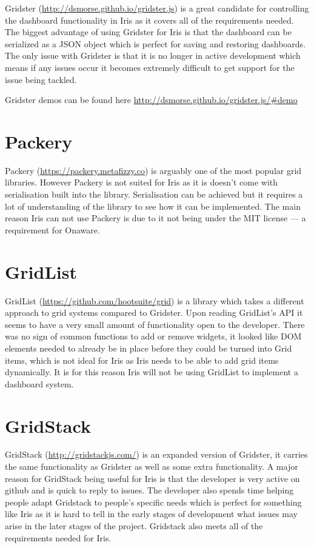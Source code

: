 \documentclass[12pt,a4paper,titlepage]{report}
\begin{document}
\begin{appendices}
Gridster (\url{http://dsmorse.github.io/gridster.js}) is a great candidate for controlling the dashboard functionality in Iris as it covers all of the requirements needed. The biggest advantage of using Gridster for Iris is that the dashboard can be serialized as a JSON object which is perfect for saving and restoring dashboards. The only issue with Gridster is that it is no longer in active development which means if any issues occur it becomes extremely difficult to get support for the issue being tackled.

Gridster demos can be found here \url{http://dsmorse.github.io/gridster.js/#demo}

\section{Packery}

Packery (\url{https://packery.metafizzy.co}) is arguably one of the most popular grid libraries. However Packery is not suited for Iris as it is doesn’t come with serialisation built into the library. Serialisation can be achieved but it requires a lot of understanding of the library to see how it can be implemented. The main reason Iris can not use Packery is due to it not being under the MIT license — a requirement for Onaware.

\section{GridList}

GridList (\url{https://github.com/hootsuite/grid}) is a library which takes a different approach to grid systems compared to Gridster. Upon reading GridList’s API it seems to have a very small amount of functionality open to the developer. There was no sign of common functions to add or remove widgets, it looked like DOM elements needed to already be in place before they could be turned into Grid items, which is not ideal for Iris as Iris needs to be able to add grid items dynamically. It is for this reason Iris will not be using GridList to implement a dashboard system.

\section{GridStack}

GridStack (\url{http://gridstackjs.com/}) is an expanded version of Gridster, it carries the same functionality as Gridster as well as some extra functionality. A major reason for GridStack being useful for Iris is that the developer is very active on github and is quick to reply to issues. The developer also spends time helping people adapt Gridstack to people's specific needs which is perfect for something like Iris as it is hard to tell in the early stages of development what issues may arise in the later stages of the project. Gridstack also meets all of the requirements needed for Iris.


\end{appendices}
\end{document}
